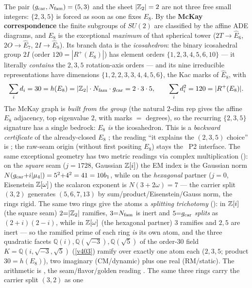 \begin{keybox}
The pair $(g_{\mathrm{car}},N_{\mathrm{fam}})=(5,3)$ and the sheet $|\mathbb Z_2|=2$ are not three free small integers: $\{2,3,5\}$ is
forced as soon as one fixes $E_8$. By the \textbf{McKay correspondence} the finite subgroups of $SU(2)$ are
classified by the affine ADE diagrams, and $E_8$ is the exceptional \emph{maximum} of that spherical tower
($2T{\to}\hat E_6$, $2O{\to}\hat E_7$, $2I{\to}\hat E_8$). Its branch data is the \emph{icosahedron}: the
binary icosahedral group $2I$ (order $120{=}|R^+(E_8)|$) has element orders $\{1,2,3,4,5,6,10\}$ --- it
literally \emph{contains} the $2,3,5$ rotation-axis orders --- and its nine irreducible representations have
dimensions $\{1,2,2,3,3,4,4,5,6\}$, the Kac marks of $\hat E_8$, with
\[
  \sum_i d_i = 30 = h(E_8) = |\mathbb Z_2|\cdot N_{\mathrm{fam}}\cdot g_{\mathrm{car}} = 2\cdot3\cdot5,\qquad
  \sum_i d_i^2 = 120 = |R^+(E_8)| .
\]
The McKay graph is \emph{built from the group} (the natural $2$-dim rep gives the affine $E_8$ adjacency,
top eigenvalue $2$, with marks $=$ degrees), so the recurring $\{2,3,5\}$ signature has a single bedrock:
$E_8$ \emph{is} the icosahedron. This is a \emph{backward certificate} of the already-closed $E_8$ \mE; the
reading ``it explains the $(2,3,5)$ choice'' is \mC; the raw-seam origin (without first positing $E_8$) stays
the \mO\ P2 interface. The same exceptional geometry has two metric readings via complex multiplication
(): on the \emph{square} seam ($j{=}1728$, Gaussian $\mathbb Z[i]$) the EM index is
the Gaussian norm $N(g_{\mathrm{car}}{+}i|\mu_4|)=5^2{+}4^2=41=10b_1$, while on the \emph{hexagonal} partner ($j{=}0$,
Eisenstein $\mathbb Z[\omega]$) the scalaron exponent is $N(3{+}2\omega)=7$ --- the carrier split $(3,2)$ generates
$(5,6,7,13)$ by sum/product/Eisenstein/Gauss norm, the rings rigid. The same two rings give the atoms a
\emph{splitting trichotomy} (): in $\mathbb Z[i]$ (the square seam) $2{=}|\mathbb Z_2|$
ramifies, $3{=}N_{\mathrm{fam}}$ is inert and $5{=}g_{\mathrm{car}}$ \emph{splits} as $(2{+}i)(2{-}i)$, while in $\mathbb Z[\omega]$ (the
hexagonal partner) $3$ ramifies and $2,5$ are inert --- so the ramified prime of each ring \emph{is} its own
atom, and the three quadratic facets $\mathbb Q(i),\mathbb Q(\sqrt{-3}),\mathbb Q(\sqrt5)$ of the order-$30$
field $K=\mathbb Q(i,\sqrt{-3},\sqrt5)$ (\vref{v403}) ramify over exactly one atom each ($2,3,5$; product
$30=h(E_8)$), two imaginary (CM/dynamic) plus one real (RM/static). The arithmetic is \mE, the
seam/flavor/golden reading \mC. The same three rings carry the carrier split $(3,2)$ as one

\end{keybox}
